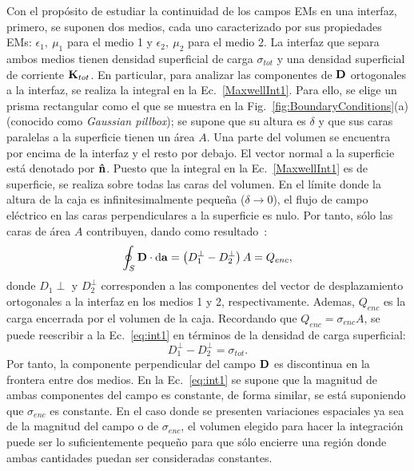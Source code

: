 Con el propósito de estudiar la continuidad de los campos EMs en una interfaz, primero, se suponen dos medios, cada uno caracterizado por sus propiedades EMs: $\epsilon_{1},\:\mu_{1}$ para el medio 1 y $\epsilon_{2},\:\mu_{2}$ para el medio 2. La interfaz que separa ambos medios tienen densidad superficial de carga $\sigma_{tot}$ y una densidad superficial de corriente $\vb{K}_{tot}$. En particular, para analizar las componentes de $\vb{D}$ ortogonales a la interfaz, se realiza la integral en la Ec.~\eqref{MaxwellInt1}. Para ello, se elige un prisma rectangular como el que se muestra en la Fig.~\ref{fig:BoundaryConditions}(a) (conocido como \textit{Gaussian pillbox}); se supone que su altura es $\delta$ y que sus caras paralelas a la superficie tienen un área $A$. Una parte del volumen se encuentra por encima de la interfaz y el resto por debajo. El vector normal a la superficie está denotado por $\vu{n}$. Puesto que la integral en la Ec.~\eqref{MaxwellInt1} es de superficie, se realiza sobre todas las caras del volumen. En el límite donde la altura de la caja es infinitesimalmente pequeña ($\delta\to 0$), el flujo de campo eléctrico en las caras perpendiculares a la superficie es nulo. Por tanto, sólo las caras de área $A$ contribuyen, dando como resultado~\cite{griffiths2013electrodynamics}: 
\begin{equation}
\begin{split}
\oint_{S}\vb{D}\cdot\dd{\vb{a}}=\left(D_{1}^{\perp}-D_{2}^{\perp}\right)A=Q_{enc},\label{eq:int1}
\end{split}
\end{equation}
donde $D_{1}\perp$ y $D_{2}^{\perp}$ corresponden a las componentes del vector de desplazamiento ortogonales a la interfaz en los medios 1 y 2, respectivamente. Ademas, $Q_{enc}$ es la carga encerrada por el volumen de la caja. Recordando que $Q_{enc}=\sigma_{enc}A$, se puede reescribir a la Ec.~\eqref{eq:int1} en términos de la densidad de carga superficial:
\begin{equation}
D_{1}^{\perp}-D_{2}^{\perp}=\sigma_{tot}.
\end{equation}
Por tanto, la componente perpendicular del campo $\vb{D}$ es discontinua en la frontera entre dos medios. En la Ec.~\eqref{eq:int1} se supone que la magnitud de ambas componentes del campo es constante, de forma similar, se está suponiendo que $\sigma_{enc}$ es constante. En el caso donde se presenten variaciones espaciales ya sea de la magnitud del campo o de $\sigma_{enc}$, el volumen elegido para hacer la integración puede ser lo suficientemente pequeño para que sólo encierre una región donde ambas cantidades puedan ser consideradas constantes.\\

